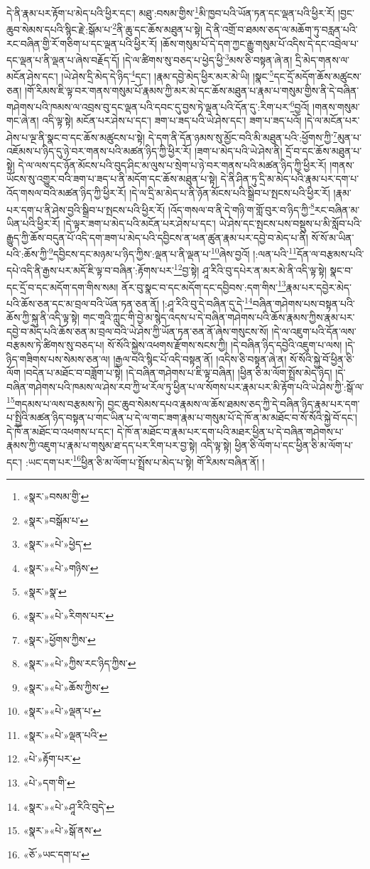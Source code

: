 དེ་ནི་རྣམ་པར་རྟོག་པ་མེད་པའི་ཕྱིར་དང་། མཐུ་:བསམ་གྱིས་\footnote{«སྣར་»བསམ་གྱི་}མི་ཁྱབ་པའི་ཡོན་ཏན་དང་ལྡན་པའི་ཕྱིར་རོ། །བྱང་ཆུབ་སེམས་དཔའི་སྙིང་རྗེ་:སྒོམ་པ་\footnote{«སྣར་»བསྒོམ་པ་}ནི་ཆུ་དང་ཆོས་མཐུན་པ་སྟེ། དེ་ནི་འགྲོ་བ་ཐམས་ཅད་ལ་མཆོག་ཏུ་བརླན་པའི་རང་བཞིན་གྱི་རོ་གཅིག་པ་དང་ལྡན་པའི་ཕྱིར་རོ། །ཆོས་གསུམ་པོ་དེ་དག་ཀྱང་རྒྱུ་གསུམ་པོ་འདིས་དེ་དང་འབྲེལ་པ་དང་ལྡན་པ་ནི་ལྡན་པ་ཞེས་བརྗོད་དོ། །དེ་ལ་ཚིགས་སུ་བཅད་པ་ཕྱེད་ཕྱི་\footnote{«སྣར་»«པེ་»ཕྱེད་}མས་ཅི་བསྟན་ཞེ་ན། དྲི་མེད་གནས་ལ་མངོན་ཤེས་དང་། །ཡེ་ཤེས་དྲི་མེད་དེ་ཉིད་\footnote{«སྣར་»«པེ་»གཉིས་}དང་། །རྣམ་དབྱེ་མེད་ཕྱིར་མར་མེ་ཡི། །སྣང་\footnote{«སྣར་»སྣ་}དང་དྲོ་མདོག་ཆོས་མཚུངས་ཅན། །གོ་རིམས་ཇི་ལྟ་བར་གནས་གསུམ་པོ་རྣམས་ཀྱི་མར་མེ་དང་ཆོས་མཐུན་པ་རྣམ་པ་གསུམ་གྱིས་ནི་དེ་བཞིན་གཤེགས་པའི་ཁམས་ལ་འབྲས་བུ་དང་ལྡན་པའི་དབང་དུ་བྱས་ཏེ་ལྡན་པའི་དོན་དུ་:རིག་པར་\footnote{«སྣར་»«པེ་»རིགས་པར་}བྱའོ། །གནས་གསུམ་གང་ཞེ་ན། འདི་ལྟ་སྟེ། མངོན་པར་ཤེས་པ་དང་། ཟག་པ་ཟད་པའི་ཡེ་ཤེས་དང་། ཟག་པ་ཟད་པའོ། །དེ་ལ་མངོན་པར་ཤེས་པ་ལྔ་ནི་སྣང་བ་དང་ཆོས་མཚུངས་པ་སྟེ། དེ་དག་ནི་དོན་ཉམས་སུ་མྱོང་བའི་མི་མཐུན་པའི་:ཕྱོགས་ཀྱི་\footnote{«སྣར་»ཕྱོགས་ཀྱིས་}མུན་པ་འཇོམས་པ་ཉིད་དུ་ཉེ་བར་གནས་པའི་མཚན་ཉིད་ཀྱི་ཕྱིར་རོ། །ཟག་པ་མེད་པའི་ཡེ་ཤེས་ནི། དྲོ་བ་དང་ཆོས་མཐུན་པ་སྟེ། དེ་ལ་ལས་དང་ཉོན་མོངས་པའི་བུད་ཤིང་མ་ལུས་པ་སྲེག་པ་ཉེ་བར་གནས་པའི་མཚན་ཉིད་ཀྱི་ཕྱིར་རོ། །གནས་ཡོངས་སུ་འགྱུར་བའི་ཟག་པ་ཟད་པ་ནི་མདོག་དང་ཆོས་མཐུན་པ་སྟེ། དེ་ནི་ཤིན་ཏུ་དྲི་མ་མེད་པའི་རྣམ་པར་དག་པ་འོད་གསལ་བའི་མཚན་ཉིད་ཀྱི་ཕྱིར་རོ། །དེ་ལ་དྲི་མ་མེད་པ་ནི་ཉོན་མོངས་པའི་སྒྲིབ་པ་སྤངས་པའི་ཕྱིར་རོ། །རྣམ་པར་དག་པ་ནི་ཤེས་བྱའི་སྒྲིབ་པ་སྤངས་པའི་ཕྱིར་རོ། །འོད་གསལ་བ་ནི་དེ་གཉི་ག་གློ་བུར་བ་ཉིད་ཀྱི་\footnote{«སྣར་»«པེ་»ཀྱིས་རང་ཉིད་ཀྱིས་}རང་བཞིན་མ་ཡིན་པའི་ཕྱིར་རོ། །དེ་ལྟར་ཟག་པ་མེད་པའི་མངོན་པར་ཤེས་པ་དང་། ཡེ་ཤེས་དང་སྤངས་པས་བསྡུས་པ་མི་སློབ་པའི་རྒྱུད་ཀྱི་ཆོས་བདུན་པོ་འདི་དག་ཟག་པ་མེད་པའི་དབྱིངས་ན་ཕན་ཚུན་རྣམ་པར་དབྱེ་བ་མེད་པ་ནི། སོ་སོ་མ་ཡིན་པའི་:ཆོས་ཀྱི་\footnote{«སྣར་»«པེ་»ཆོས་ཀྱིས་}དབྱིངས་དང་མཉམ་པ་ཉིད་ཀྱིས་:ལྡན་པ་ནི་ལྡན་པ་\footnote{«སྣར་»«པེ་»ལྡན་པ་}ཞེས་བྱའོ། །:ལན་པའི་\footnote{«སྣར་»«པེ་»ལྡན་པའི་}དོན་ལ་བརྩམས་པའི་དཔེ་འདི་ནི་རྒྱས་པར་མདོ་ཇི་ལྟ་བ་བཞིན་:རྟོགས་པར་\footnote{«པེ་»རྟོག་པར་}བྱ་སྟེ། ཤཱ་རིའི་བུ་དཔེར་ན་མར་མེ་ནི་འདི་ལྟ་སྟེ། སྣང་བ་དང་དྲོ་བ་དང་མདོག་དག་གིས་སམ། ནོར་བུ་སྣང་བ་དང་མདོག་དང་དབྱིབས་:དག་གིས་\footnote{«པེ་»དག་གི་}རྣམ་པར་དབྱེར་མེད་པའི་ཆོས་ཅན་དང་མ་བྲལ་བའི་ཡོན་ཏན་ཅན་ནོ། །:ཤཱ་རིའི་བུ་དེ་བཞིན་དུ་དེ་\footnote{«སྣར་»«པེ་»ཤཱ་རིའི་བུདེ་}བཞིན་གཤེགས་པས་བསྟན་པའི་ཆོས་ཀྱི་སྐུ་ནི་འདི་ལྟ་སྟེ། གང་གཱའི་ཀླུང་གི་བྱེ་མ་སྙེད་འདས་པ་དེ་བཞིན་གཤེགས་པའི་ཆོས་རྣམས་ཀྱིས་རྣམ་པར་དབྱེ་བ་མེད་པའི་ཆོས་ཅན་མ་བྲལ་བའི་ཡེ་ཤེས་ཀྱི་ཡོན་ཏན་ཅན་ནོ་ཞེས་གསུངས་སོ། །དེ་ལ་འཇུག་པའི་དོན་ལས་བརྩམས་ཏེ་ཚིགས་སུ་བཅད་པ། སོ་སོའི་སྐྱེས་འཕགས་རྫོགས་སངས་ཀྱི། །དེ་བཞིན་ཉིད་དབྱེའི་འཇུག་པ་ལས། །དེ་ཉིད་གཟིགས་པས་སེམས་ཅན་ལ། །རྒྱལ་བའི་སྙིང་པོ་འདི་བསྟན་ནོ། །འདིས་ཅི་བསྟན་ཞེ་ན། སོ་སོའི་སྐྱེ་བོ་ཕྱིན་ཅི་ལོག །བདེན་པ་མཐོང་བ་བཟློག་པ་སྟེ། །དེ་བཞིན་གཤེགས་པ་ཇི་ལྟ་བཞིན། །ཕྱིན་ཅི་མ་ལོག་སྤྲོས་མེད་ཉིད། །དེ་བཞིན་གཤེགས་པའི་ཁམས་ལ་ཤེས་རབ་ཀྱི་ཕ་རོལ་ཏུ་ཕྱིན་པ་ལ་སོགས་པར་རྣམ་པར་མི་རྟོག་པའི་ཡེ་ཤེས་ཀྱི་:སྒོ་ལ་\footnote{«སྣར་»«པེ་»སྒོ་ནས་}གདམས་པ་ལས་བརྩམས་ཏེ། བྱང་ཆུབ་སེམས་དཔའ་རྣམས་ལ་ཆོས་ཐམས་ཅད་ཀྱི་དེ་བཞིན་ཉིད་རྣམ་པར་དག་པ་སྤྱིའི་མཚན་ཉིད་བསྟན་པ་གང་ཡིན་པ་དེ་ལ་གང་ཟག་རྣམ་པ་གསུམ་པོ་དེ་ཁོ་ན་མ་མཐོང་བ་སོ་སོའི་སྐྱེ་བོ་དང་། དེ་ཁོ་ན་མཐོང་བ་འཕགས་པ་དང་། དེ་ཁོ་ན་མཐོང་བ་རྣམ་པར་དག་པའི་མཐར་ཕྱིན་པ་དེ་བཞིན་གཤེགས་པ་རྣམས་ཀྱི་འཇུག་པ་རྣམ་པ་གསུམ་ཐ་དད་པར་རིག་པར་བྱ་སྟེ། འདི་ལྟ་སྟེ། ཕྱིན་ཅི་ལོག་པ་དང་ཕྱིན་ཅི་མ་ལོག་པ་དང་། :ཡང་དག་པར་\footnote{«ཅོ་»ཡང་དག་པ་}ཕྱིན་ཅི་མ་ལོག་པ་སྤྲོས་པ་མེད་པ་སྟེ། གོ་རིམས་བཞིན་ནོ། །
